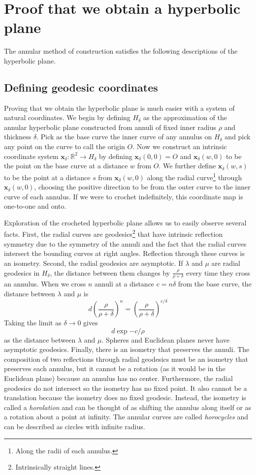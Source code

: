 \documentclass[letterpaper,titlepage]{article}
\begin{document}
\section{Proof that we obtain a hyperbolic plane}
The annular method of construction satisfies the following descriptions of the hyperbolic plane.
\subsection{Defining geodesic coordinates}
Proving that we obtain the hyperbolic plane is much easier with a system of natural coordinates.
We begin by defining $H_\delta$ as the approximation of the annular hyperbolic plane constructed from annuli of fixed inner radius $\rho$ and thickness $\delta$.
Pick as the base curve the inner curve of any annulus on $H_\delta$ and pick any point on the curve to call the origin $O$.
Now we construct an intrinsic coordinate system $\mathbf{x}_\delta : \mathbb{R}^2 \to H_\delta$ by defining $\mathbf{x}_\delta(0,0) = O$ and $\mathbf{x}_\delta(w,0)$ to be the point on the base curve at a distance $w$ from $O$.
We further define $\mathbf{x}_\delta(w,s)$ to be the point at a distance $s$ from $\mathbf{x}_\delta(w,0)$ along the radial curve\footnote{Along the radii of each annulus.} through $\mathbf{x}_\delta(w,0)$, choosing the positive direction to be from the outer curve to the inner curve of each annulus.
If we were to crochet indefinitely, this coordinate map is one-to-one and onto.

Exploration of the crocheted hyperbolic plane allows us to easily observe several facts.
First, the radial curves are geodesics\footnote{Intrinsically straight lines.} that have intrinsic reflection symmetry due to the symmetry of the annuli and the fact that the radial curves intersect the bounding curves at right angles.
Reflection through these curves is an isometry.
Second, the radial geodesics are asymptotic.
If $\lambda$ and $\mu$ are radial geodesics in $H_\delta$, the distance between them changes by $\frac{\rho}{\rho+\delta}$ every time they cross an annulus.
When we cross $n$ annuli at a distance $c = n\delta$ from the base curve, the distance between $\lambda$ and $\mu$ is
\[ d \left( \frac{\rho}{\rho+\delta} \right)^n =  \left( \frac{\rho}{\rho+\delta} \right)^{c/\delta} \]
Taking the limit as $\delta \to 0$ gives
\[ d \exp{-c/\rho} \]
as the distance between $\lambda$ and $\mu$.
Spheres and Euclidean planes never have asymptotic geodesics.
Finally, there is an isometry that preserves the annuli.
The composition of two reflections through radial geodesics must be an isometry that preserves each annulus, but it cannot be a rotation (as it would be in the Euclidean plane) because an annulus has no center.
Furthermore, the radial geodesics do not intersect so the isometry has no fixed point.
It also cannot be a translation because the isometry does no fixed geodesic.
Instead, the isometry is called a \emph{horolation} and can be thought of as shifting the annulus along itself or as a rotation about a point at infinity.
The annular curves are called \emph{horocycles} and can be described as circles with infinite radius.
\end{document}
